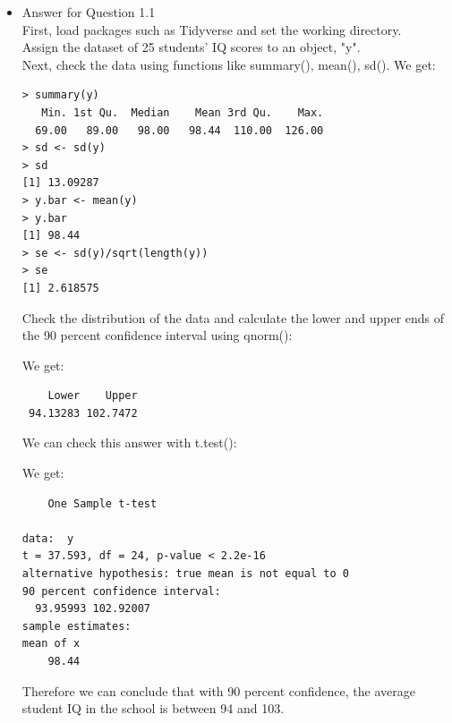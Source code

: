 \documentclass[12pt,letterpaper]{article}
\begin{document}
\begin{itemize}	
\item
Answer for Question 1.1\\
\noindent First, load packages such as Tidyverse and set the working directory.\\ 
\noindent Assign the dataset of 25 students’ IQ scores to an object, "y".\\
\noindent Next, check the data using functions like summary(), mean(), sd(). We get:\\
\begin{verbatim}
> summary(y)
   Min. 1st Qu.  Median    Mean 3rd Qu.    Max. 
  69.00   89.00   98.00   98.44  110.00  126.00 
> sd <- sd(y)
> sd
[1] 13.09287
> y.bar <- mean(y)
> y.bar
[1] 98.44
> se <- sd(y)/sqrt(length(y)) 
> se
[1] 2.618575
\end{verbatim}
\vspace{.3cm}
\noindent Check the distribution of the data and calculate the lower and upper ends of the 90 percent confidence interval using qnorm():\\
\vspace{.3cm}
  
\vspace{.3cm}
\noindent We get:
\begin{verbatim}
    Lower    Upper
 94.13283 102.7472
\end{verbatim}
\vspace{.3cm}
\noindent We can check this answer with t.test():\\
\vspace{.3cm}
  
\vspace{.3cm}
\noindent We get:
\begin{verbatim}
	One Sample t-test

data:  y
t = 37.593, df = 24, p-value < 2.2e-16
alternative hypothesis: true mean is not equal to 0
90 percent confidence interval:
  93.95993 102.92007
sample estimates:
mean of x 
    98.44
\end{verbatim}
\vspace{.3cm}
\noindent Therefore we can conclude that with 90 percent confidence, the average student IQ in the school is between 94 and 103.\\
\end{itemize}
\end{document}
